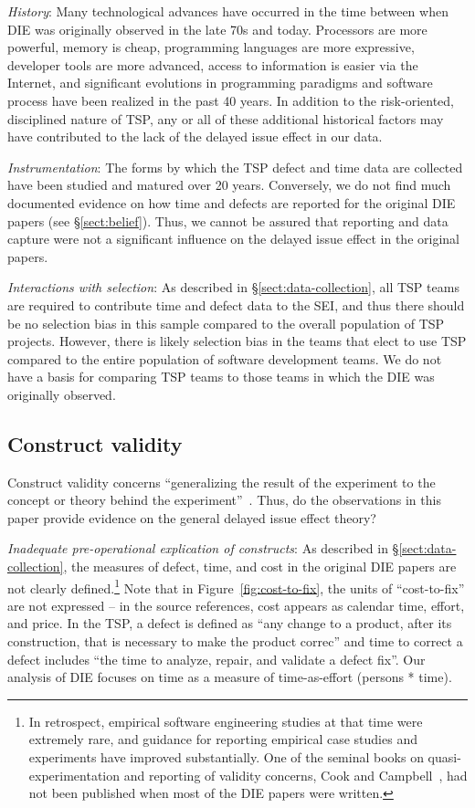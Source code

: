 \documentclass[smallcondensed]{svjour3}
\newcommand{\tion}[1]{\S\ref{sect:#1}}
\begin{document}
\textit{History}: Many technological advances have occurred in the time between when DIE was originally observed in the late 70s and today. Processors are more powerful, memory is cheap, programming languages are more expressive, developer tools are more advanced, access to information is easier via the Internet, and significant evolutions in programming paradigms and software process have been realized in the past 40 years. In addition to the risk-oriented, disciplined nature of TSP, any or all of these additional historical factors may have contributed to the lack of the delayed issue effect in our data. 

\textit{Instrumentation}: The forms by which the TSP defect and time data are collected have been studied and matured over 20 years. Conversely, we do not find much documented evidence on how time and defects are reported for the original DIE papers (see \tion{belief}). Thus, we cannot be assured that reporting and data capture were not a significant influence on the delayed issue effect in the original papers.

\textit{Interactions with selection}: As described in \tion{data-collection}, all TSP teams are required to contribute time and defect data to the SEI, and thus there should be no selection bias in this sample compared to the overall population of TSP projects. However, there is likely selection bias in the teams that elect to use TSP compared to the entire population of software development teams. We do not have a basis for comparing TSP teams to those teams in which the DIE was originally observed.


\subsection{Construct validity} \label{sect:construct}
Construct validity concerns ``generalizing the result of the experiment to the concept or theory behind the experiment''~\cite{wohlin2012}. Thus, do the observations in this paper provide evidence on the general delayed issue effect theory?

\textit{Inadequate pre-operational explication of constructs}: As described in \tion{data-collection}, the measures of defect, time, and cost in the original DIE papers are not clearly defined.\footnote{In retrospect, empirical software engineering studies at that time were extremely rare, and guidance for reporting empirical case studies and experiments have improved substantially. One of the seminal books on quasi-experimentation and reporting of validity concerns, Cook and Campbell~\cite{cook1979}, had not been published when most of the DIE papers were written.} Note that in Figure~\ref{fig:cost-to-fix}, the units of ``cost-to-fix'' are not expressed -- in the source references, cost appears as calendar time, effort, and price. In the TSP, a defect is defined as ``any change to a product, after its construction, that is necessary to make the product correc'' and time to correct a defect includes ``the time to analyze, repair, and validate a defect fix''. Our analysis of DIE focuses on time as a measure of time-as-effort (persons * time). 
\end{document}
